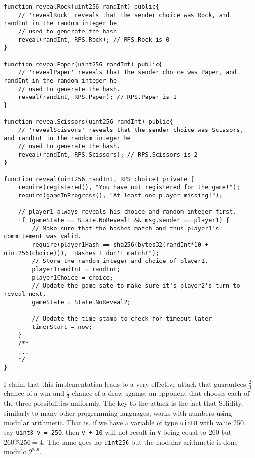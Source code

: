 \documentclass{article}
\begin{document}
    \begin{lstlisting}[language=Solidity]
function revealRock(uint256 randInt) public{
    // 'revealRock' reveals that the sender choice was Rock, and randInt in the random integer he
    // used to generate the hash.
    reveal(randInt, RPS.Rock); // RPS.Rock is 0
}

function revealPaper(uint256 randInt) public{
    // 'revealPaper' reveals that the sender choice was Paper, and randInt in the random integer he
    // used to generate the hash.
    reveal(randInt, RPS.Paper); // RPS.Paper is 1
}

function revealScissors(uint256 randInt) public{
    // 'revealScissors' reveals that the sender choice was Scissors, and randInt in the random integer he
    // used to generate the hash.
    reveal(randInt, RPS.Scissors); // RPS.Scissors is 2
}

function reveal(uint256 randInt, RPS choice) private {
    require(registered(), "You have not registered for the game!");
    require(gameInProgress(), "At least one player missing!");

    // player1 always reveals his choice and random integer first.
    if (gameState == State.NoReveal1 && msg.sender == player1) {
        // Make sure that the hashes match and thus player1's commitement was valid.
        require(player1Hash == sha256(bytes32(randInt*10 + uint256(choice))), "Hashes 1 don't match!");
        // Store the random integer and choice of player1.
        player1randInt = randInt;
        player1Choice = choice;
        // Update the game sate to make sure it's player2's turn to reveal next.
        gameState = State.NoReveal2;

        // Update the time stamp to check for timeout later
        timerStart = now;
    }
    /**
    ...
    */
}
    \end{lstlisting}

    \noindent I claim that this implementation leads to a
    very effective attack that guarantees \(\frac{2}{3}\)
    chance of a win and \(\frac{1}{3}\) chance of a draw
    against an opponent that chooses each of the three
    possibilities uniformly. The key to the attack is the
    fact that Solidity, similarly to many other programming
    languages, works with numbers using modular arithmetic.
    That is, if we have a variable of type \verb|uint8| with
    value 250, say \verb|uint8 v = 250|, then \verb|v + 10|
    will not result in \verb|v| being equal to 260 but \(260
    \% 256 = 4\). The same goes for \verb|uint256| but the
    modular arithmetic is done modulo \(2^{256}\).
    \newline
\end{document}
